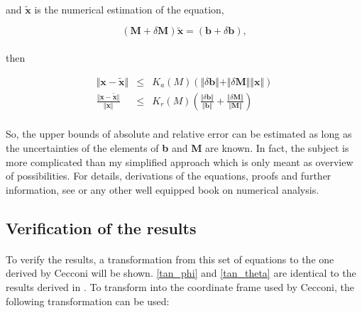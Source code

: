 \documentclass[a4paper,10pt]{thesis}
\begin{document}
\paragraph*{}
and $\tilde{\textbf{x}}$ is the numerical estimation of the equation,

\begin{equation}
(\textbf{M}+\delta \textbf{M})\tilde{\textbf{x}}=(\textbf{b}+\delta \textbf{b}),
\end{equation}
\paragraph*{}
then

\begin{eqnarray}
\Vert \textbf{x} - \tilde{\textbf{x}}\Vert  &\leq & K_a(M) (\Vert \delta \textbf{b} \Vert + \Vert \delta \textbf{M} \Vert \Vert \textbf{x} \Vert )  \\
\frac{\Vert \textbf{x} - \tilde{\textbf{x}}\Vert}{\Vert \textbf{x} \Vert} &\leq & K_r(M) \left( \frac{\Vert \delta \textbf{b} \Vert}{\Vert \textbf{b} \Vert} + \frac{\Vert \delta \textbf{M} \Vert}{\Vert \textbf{M} \Vert} \right)
\end{eqnarray}

\paragraph*{}
So, the upper bounds of absolute and relative error can be estimated as long as the uncertainties of the elements of \textbf{b} and \textbf{M} are known. In fact, the subject is more complicated than my simplified approach which is only meant as overview of possibilities. For details, derivations of the equations, proofs and further information, see \cite{burdenfaires} or any other well equipped book on numerical analysis.

\subsection{Verification of the results}
\paragraph*{}
To verify the results, a transformation from this set of equations to the one derived by Cecconi will be shown. \ref{tan_phi} and \ref{tan_theta} are identical to the results derived in \cite{cecconi04}. To transform into the coordinate frame used by Cecconi, the following transformation can be used:
\end{document}
